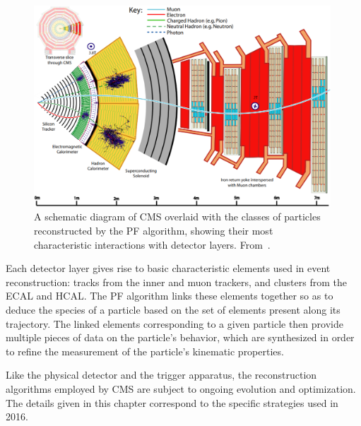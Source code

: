 \documentclass[oneside, letterpaper, 12pt, oldfontcommands]{memoir}
\begin{document}
\begin{figure}[hbtp]
  \begin{center}
    \includegraphics[width=0.99\textwidth]{Figures/particle_flow.png}
    \caption{
    A schematic diagram of CMS overlaid with
    the classes of particles reconstructed by the PF algorithm, showing their most
    characteristic interactions with detector layers.
    From~\cite{ref:1748-0221/12/10/P10003}.
    }
    \label{fig:particle_flow}
  \end{center}
\end{figure}

Each detector layer gives rise to basic characteristic elements used in event reconstruction:
tracks from the inner and muon trackers, and clusters from the ECAL and HCAL. The PF algorithm links these elements together
so as to deduce the species of a particle based on the set of elements present along its trajectory. The linked elements
corresponding to a given particle then provide multiple pieces of data on the particle's behavior, which are synthesized
in order to refine the measurement of the particle's kinematic properties.

Like the physical detector and the trigger apparatus, the reconstruction algorithms employed by CMS are subject to ongoing evolution
and optimization. The details given in this chapter correspond to the specific strategies used in 2016.
\end{document}
